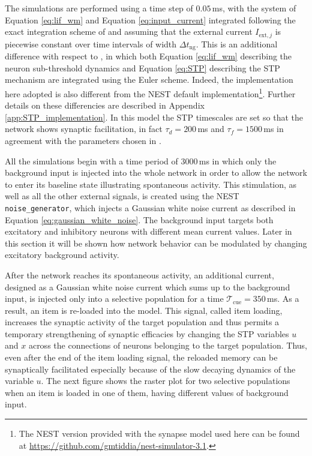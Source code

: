 \documentclass[a4paper, 12pt, twoside, openright]{book}
\begin{document}
The simulations are performed using a time step of $0.05$\,ms, with the system of Equation \eqref{eq:lif_wm} and Equation \eqref{eq:input_current} integrated following the exact integration scheme of \cite{Rotter1999} and assuming that the external current $I_{\text{ext},j}$ is piecewise constant over time intervals of width $\Delta t_{\text{ng}}$. This is an additional difference with respect to \cite{Mongillo2008}, in which both Equation \eqref{eq:lif_wm} describing the neuron sub-threshold dynamics and Equation \eqref{eq:STP} describing the STP mechanism are integrated using the Euler scheme. Indeed, the implementation here adopted is also different from the NEST default implementation\footnote{The NEST version provided with the synapse model used here can be found at \url{https://github.com/gmtiddia/nest-simulator-3.1}.}. Further details on these differencies are described in Appendix \ref{app:STP_implementation}.
In this model the STP timescales are set so that the network shows synaptic facilitation, in fact $\tau_d = 200$\,ms and $\tau_f = 1500$\,ms in agreement with the parameters chosen in \cite{Mongillo2008}. 


All the simulations begin with a time period of $3000$\,ms in which only the background input is injected into the whole network in order to allow the network to enter its baseline state illustrating spontaneous activity. This stimulation, as well as all the other external signals, is created using the NEST \texttt{noise\_generator}, which injects a Gaussian white noise current as described in Equation \eqref{eq:gaussian_white_noise}. The background input targets both excitatory and inhibitory neurons with different mean current values. Later in this section it will be shown how network behavior can be modulated by changing excitatory background activity.


After the network reaches its spontaneous activity, an additional current, designed as a Gaussian white noise current which sums up to the background input, is injected only into a selective population for a time $\mathcal{T}_{\text{cue}}=350$\,ms. As a result, an item is re-loaded into the model. This signal, called item loading, increases the synaptic activity of the target population and thus permits a temporary strengthening of synaptic efficacies by changing the STP variables $u$ and $x$ across the connections of neurons belonging to the target population. Thus, even after the end of the item loading signal, the reloaded memory can be synaptically facilitated especially because of the slow decaying dynamics of the variable $u$. The next figure shows the raster plot for two selective populations when an item is loaded in one of them, having different values of background input.
\end{document}
